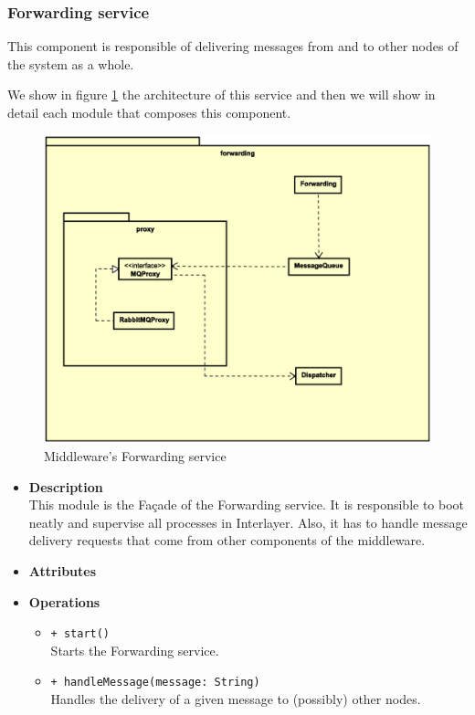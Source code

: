 \subsubsection{Forwarding service}

This component is responsible of delivering messages from and to other nodes of
the system as a whole.

We show in figure \ref{fig:mw-forwarding} the architecture of this service and
then we will show in detail each module that composes this component.

\begin{figure}[H]
  \centering
  \includegraphics[width=\columnwidth]{images/solution/mw/forwarding.eps}
  \caption{Middleware's Forwarding service}
  \label{fig:mw-forwarding}
\end{figure}

\FloatBarrier
\begin{itemize}
  \item \textbf{Description} \\
    This module is the Fa\c cade of the Forwarding service. It is responsible
    to boot neatly and supervise all processes in Interlayer. Also, it has to
    handle message delivery requests that come from other components of the
    middleware.
  \item \textbf{Attributes}
  \item \textbf{Operations}
  \begin{itemize}
    \item \texttt{+ start()} \\
    Starts the Forwarding service.
    \item \texttt{+ handleMessage(message: String)} \\
    Handles the delivery of a given message to (possibly) other nodes.
  \end{itemize}
\end{itemize}

